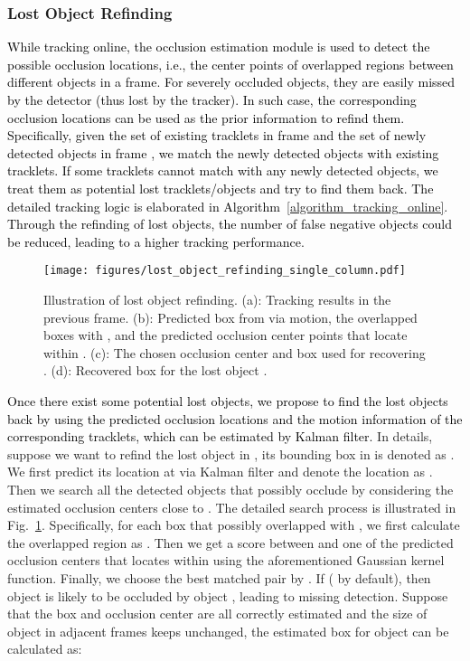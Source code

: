 \documentclass[final,1p,times,twocolumn]{elsarticle}
\newcommand{\fref}[1]{Fig.~\ref{#1}}
\newcommand{\Aref}[1]{Algorithm~\ref{#1}}
\newcommand{\qiankun}[1]{\textcolor{black}{#1}}
\begin{document}
	\subsubsection{Lost Object Refinding}
	\label{section_lost_object_refinding}
	\qiankun{While tracking online, the occlusion estimation module is used to detect the possible occlusion locations, i.e., the center points of overlapped regions between different objects in a frame. 
	For severely occluded objects, they are easily missed by the detector (thus lost by the tracker). In such case, the corresponding occlusion locations can be used as the prior information to refind them. Specifically, given the set of existing tracklets in frame  and the set of newly detected objects in frame ,  we match the newly detected objects with existing tracklets.
	If some tracklets cannot match with any newly detected objects, we treat them as potential lost tracklets/objects and try to find them back. The detailed tracking logic is elaborated in \Aref{algorithm_tracking_online}. Through the refinding of lost objects, the number of false negative objects could be reduced, leading to a higher tracking performance.}
	
	\begin{figure}[t]
		\centering
		\texttt{[image: figures/lost\_object\_refinding\_single\_column.pdf]}
		\caption{
			Illustration of lost object refinding. (a): Tracking results in the previous frame. (b): Predicted box  from  via motion, the overlapped boxes with , and the predicted occlusion center points that locate within . (c): The chosen occlusion center  and box  used for recovering . (d): Recovered box  for the lost object .
		}
		\label{figure_lost_object_refinding}
	\end{figure}
	
	\qiankun{Once there exist some potential lost objects, we propose to find the lost objects back by using the predicted occlusion locations and the motion information of the corresponding tracklets, which can be estimated by Kalman filter. }
	In details, suppose we want to refind the lost object  in , its bounding box in  is denoted as  . We first predict its location at  via Kalman filter and denote the location as . Then we search all the detected objects that possibly occlude   by considering the estimated occlusion centers close to . The detailed search process is illustrated in \fref{figure_lost_object_refinding}. Specifically, for each box  that possibly overlapped with , 
	we first calculate the overlapped region as . Then we get a score between  and one of the predicted occlusion centers   that locates within  using the aforementioned Gaussian kernel function.
	Finally, we choose the best matched pair by . If  ( by default), 
	then object  is likely to be occluded by object , leading to missing detection. Suppose that the box  and occlusion center  are all correctly estimated and the size of object  in adjacent frames keeps unchanged, the estimated box  for object  can be calculated as:
	
\end{document}
